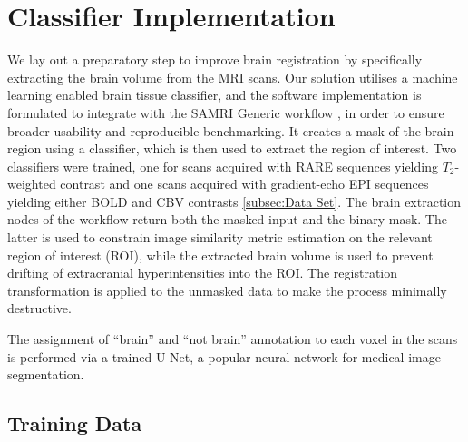 \section{Classifier Implementation}
We lay out a preparatory step to improve brain registration by specifically extracting the brain volume from the MRI scans.
Our solution utilises a machine learning enabled brain tissue classifier, and the software implementation is formulated to integrate with the SAMRI Generic workflow \cite{ioanas_optimized_2019}, in order to ensure broader usability and reproducible benchmarking.
It creates a mask of the brain region using a classifier, which is then used to extract the region of interest.
Two classifiers were trained, one for scans acquired with RARE sequences yielding $T_2$-weighted contrast and one scans acquired with gradient-echo EPI sequences yielding either BOLD \cite{bold} and CBV \cite{cbv} contrasts \cref{subsec:Data Set}.
The brain extraction nodes of the workflow return both the masked input and the binary mask.
The latter is used to constrain image similarity metric estimation on the relevant region of interest (ROI), while the extracted brain volume is used to prevent drifting of extracranial hyperintensities into the ROI.
The registration transformation is applied to the unmasked data to make the process minimally destructive.

The assignment of “brain” and “not brain” annotation to each voxel in the scans is performed via a trained U-Net, a popular neural network for medical image segmentation.

\subsection{Training Data}

